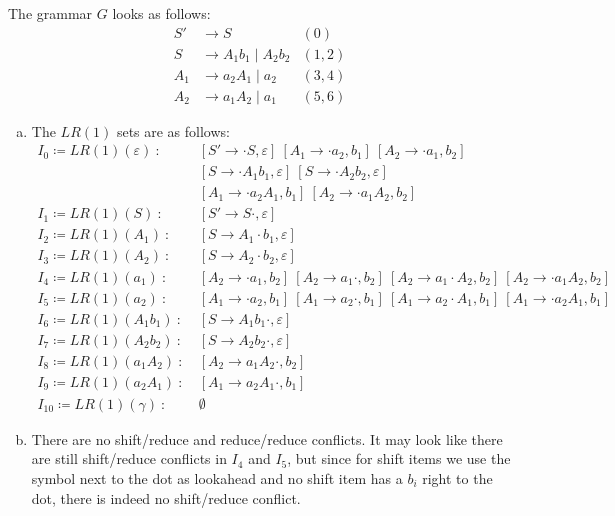 \begin{solution}
The grammar $G$ looks as follows:
\[
\begin{array}{rll}
    S'  & \to S & (0) \\
    S   & \to A_1 b_1 \mid A_2 b_2 & (1,2)\\
    A_1 & \to a_2 A_1 \mid a_2 & (3,4)\\
    A_2 & \to a_1 A_2 \mid a_1 & (5,6)
\end{array}
\]
\begin{enumerate}[(a)]
\item The $LR(1)$ sets are as follows:
    \begin{align*}
        I_0 \coloneqq LR(1)(\varepsilon) ~:~ & [ S' \to \cdot S, \varepsilon] ~ [ A_1 \to \cdot a_2, b_1] ~ [ A_2 \to \cdot a_1, b_2] ~\\
                                             & [ S \to \cdot A_1 b_1, \varepsilon] ~ [ S \to \cdot A_2 b_2 , \varepsilon] ~\\
                                             & [ A_1 \to \cdot a_2 A_1, b_1] ~ [ A_2 \to \cdot a_1 A_2, b_2] \\
        I_1 \coloneqq LR(1)(S) ~:~ & [ S' \to S \cdot, \varepsilon]\\
        I_2 \coloneqq LR(1)(A_1) ~:~ & [ S \to A_1 \cdot b_1 , \varepsilon]\\
        I_3 \coloneqq LR(1)(A_2) ~:~ & [ S \to A_2 \cdot b_2 , \varepsilon]\\
        I_4 \coloneqq LR(1)(a_1) ~:~ & [ A_2 \to \cdot a_1, b_2] ~ [ A_2 \to a_1 \cdot, b_2] ~ [ A_2 \to a_1 \cdot A_2, b_2] ~ [ A_2 \to \cdot a_1 A_2, b_2]\\
        I_5 \coloneqq LR(1)(a_2) ~:~ & [ A_1 \to \cdot a_2, b_1] ~ [ A_1 \to a_2 \cdot, b_1] ~ [ A_1 \to a_2 \cdot A_1, b_1] ~ [ A_1 \to \cdot a_2 A_1, b_1]\\
        I_6 \coloneqq LR(1)(A_1 b_1) ~:~ & [ S \to A_1 b_1 \cdot, \varepsilon]\\
        I_7 \coloneqq LR(1)(A_2 b_2) ~:~ & [ S \to A_2 b_2 \cdot, \varepsilon]\\
        I_8 \coloneqq LR(1)(a_1 A_2) ~:~ & [ A_2 \to a_1 A_2 \cdot, b_2]\\
        I_9 \coloneqq LR(1)(a_2 A_1) ~:~ & [ A_1 \to a_2 A_1 \cdot, b_1]\\
        I_{10} \coloneqq LR(1)(\gamma) ~:~ & \emptyset
    \end{align*}
    
\item There are no shift/reduce and reduce/reduce conflicts. It may look like there are still shift/reduce conflicts in $I_4$ and $I_5$, but since for shift items we use the symbol next to the dot as lookahead and no shift item has a $b_i$ right to the dot, there is indeed no shift/reduce conflict.


\end{enumerate}
\end{solution}
